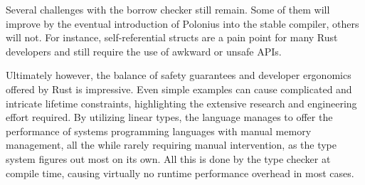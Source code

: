 \documentclass[sigplan,11pt,screen,nonacm]{acmart}
\begin{document}
Several challenges with the borrow checker still remain. Some of them will improve by the eventual introduction of Polonius into the stable compiler, others will not. For instance, self-referential structs are a pain point for many Rust developers and still require the use of awkward or unsafe APIs.

Ultimately however, the balance of safety guarantees and developer ergonomics offered by Rust is impressive. Even simple examples can cause complicated and intricate lifetime constraints, highlighting the extensive research and engineering effort required. By utilizing linear types, the language manages to offer the performance of systems programming languages with manual memory management, all the while rarely requiring manual intervention, as the type system figures out most on its own. All this is done by the type checker at compile time, causing virtually no runtime performance overhead in most cases.



\end{document}
